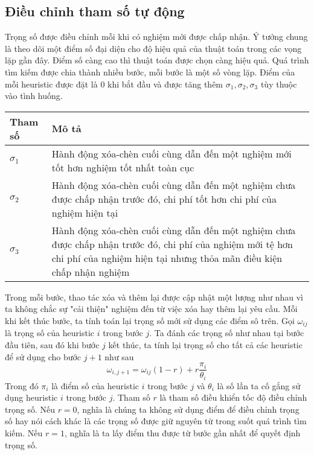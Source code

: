 \subsection{Điều chỉnh tham số tự động}
Trọng số được điều chỉnh mỗi khi có nghiệm mới được chấp nhận. Ý tưởng chung là theo dõi một điểm số đại diện cho độ hiệu quả của thuật toán trong các vọng lặp gần đây. Điểm số càng cao thì thuật toán được chọn càng hiệu quả. Quá trình tìm kiếm được chia thành nhiều bước, mỗi bước là một số vòng lặp. Điểm của mỗi heuristic được đặt là $0$ khi bắt đầu và được tăng thêm $\sigma_1, \sigma_2, \sigma_3$ tùy thuộc vào tình huống.
\begin{table}[caption={Tham số cập nhật trọng số}, label=tab:weight]
	\begin{tabularx}{\textwidth}{|l|X|}
		\hline
		Tham số    & Mô tả  \\ \hline
		$\sigma_1$ & Hành động xóa-chèn cuối cùng dẫn đến một nghiệm mới tốt hơn nghiệm tốt nhất toàn cục \\ \hline
		$\sigma_2$ & Hành động xóa-chèn cuối cùng dẫn đến một nghiệm chưa được chấp nhận trước đó, chi phí tốt hơn chi phí của nghiệm hiện tại \\ \hline
		$\sigma_3$ & Hành động xóa-chèn cuối cùng dẫn đến một nghiệm chưa được chấp nhận trước đó, chi phí của nghiệm mới tệ hơn chi phí của nghiệm hiện tại nhưng thỏa mãn điều kiện chấp nhận nghiệm \\ \hline
	\end{tabularx}
\end{table}

Trong mỗi bước, thao tác xóa và thêm lại được cập nhật một lượng như nhau vì ta không chắc sự "cải thiện" nghiệm đến từ việc xóa hay thêm lại yêu cầu. Mỗi khi kết thúc bước, ta tính toán lại trọng số mới sử dụng các điểm sô trên. Gọi $\omega_{ij}$ là trọng số của heuristic $i$ trong bước $j$. Ta đánh các trọng số như nhau tại bước đầu tiên, sau đó khi bước $j$ kết thúc, ta tính lại trọng số cho tất cả các heuristic để sử dụng cho bước $j+1$ như sau
\begin{equation}
	\label{eq:adaptive_weight}
	\omega_{i, j+1} = \omega_{ij}(1-r)+r\frac{\pi_i}{\theta_i}
\end{equation}
Trong đó $\pi_i$ là điểm số của heuristic $i$ trong bước $j$ và $\theta_i$ là số lần ta cố gắng sử dụng heuristic $i$ trong bước $j$. Tham số $r$ là tham số điều khiển tốc độ điều chỉnh trọng số. Nếu $r=0$, nghĩa là chúng ta không sử dụng điểm để điều chỉnh trọng số hay nói cách khác là các trọng số được giữ nguyên từ trong suốt quá trình tìm kiếm. Nếu $r=1$, nghĩa là ta lấy điểm thu được từ bước gần nhất để quyết định trọng số.


